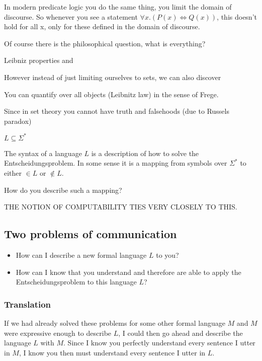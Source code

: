 In modern predicate logic you do the same thing, you limit the domain of discourse. So whenever you see a statement $\forall x . (P(x) \Leftrightarrow Q(x))$, this doesn't hold for all x, only for these defined in the domain of discourse.

Of course there is the philosophical question, what is everything?

Leibniz properties and 

However instead of just limiting ourselves to sets, we can also discover

You can quantify over all objects (Leibnitz law) in the sense of Frege. 

Since in set theory you cannot have truth and falsehoods (due to Russels paradox)
 



$L \subseteq \Sigma^*$

The syntax of a language $L$ is a description of how to solve the Entscheidungsproblem. In some sense it is a mapping from symbols over $\Sigma^*$ to either $\in L$ or $\notin L$.

How do you describe such a mapping?





THE NOTION OF COMPUTABILITY TIES VERY CLOSELY TO THIS. 

\fi

\subsection{Two problems of communication}
\begin{itemize}
\item How can I describe a new formal language $L$ to you?
\item How can I know that you understand and therefore are able to apply the Entscheidungsproblem to this language $L$?
\end{itemize}

\subsubsection{Translation}
If we had already solved these problems for some other formal language $M$ and $M$ were expressive enough to describe $L$, I could then go ahead and describe the language $L$ with $M$. Since I know you perfectly understand every sentence I utter in $M$, I know you then must understand every sentence I utter in $L$.

